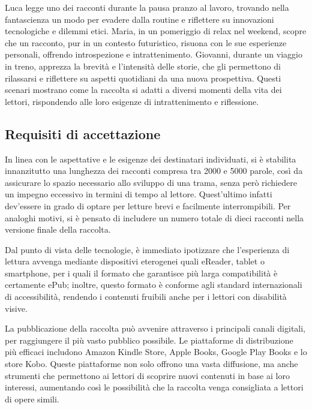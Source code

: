 \documentclass[a4paper,12pt]{article}
\begin{document}
Luca legge uno dei racconti durante la pausa pranzo al lavoro, trovando nella fantascienza un modo per evadere dalla routine e riflettere su innovazioni tecnologiche e dilemmi etici. Maria, in un pomeriggio di relax nel weekend, scopre che un racconto, pur in un contesto futuristico, risuona con le sue esperienze personali, offrendo introspezione e intrattenimento. Giovanni, durante un viaggio in treno, apprezza la brevità e l'intensità delle storie, che gli permettono di rilassarsi e riflettere su aspetti quotidiani da una nuova prospettiva. Questi scenari mostrano come la raccolta si adatti a diversi momenti della vita dei lettori, rispondendo alle loro esigenze di intrattenimento e riflessione.

\subsection*{Requisiti di accettazione}

In linea con le aspettative e le esigenze dei destinatari individuati, si è stabilita innanzitutto una lunghezza dei racconti compresa tra 2000 e 5000 parole, così da assicurare lo spazio necessario allo sviluppo di una trama, senza però richiedere un impegno eccessivo in termini di tempo al lettore. Quest'ultimo infatti dev'essere in grado di optare per letture brevi e facilmente interrompibili. Per analoghi motivi, si è pensato di includere un numero totale di dieci racconti nella versione finale della raccolta. 

\bigbreak 

Dal punto di vista delle tecnologie, è immediato ipotizzare che l'esperienza di lettura avvenga mediante dispositivi eterogenei quali eReader, tablet o smartphone, per i quali il formato che garantisce più larga compatibilità è certamente ePub; inoltre, questo formato è conforme agli standard internazionali di accessibilità, rendendo i contenuti fruibili anche per i lettori con disabilità visive.

\bigbreak

La pubblicazione della raccolta può avvenire attraverso i principali canali digitali, per raggiungere il più vasto pubblico possibile. Le piattaforme di distribuzione più efficaci includono Amazon Kindle Store, Apple Books, Google Play Books e lo store Kobo. Queste piattaforme non solo offrono una vasta diffusione, ma anche strumenti che permettono ai lettori di scoprire nuovi contenuti in base ai loro interessi, aumentando così le possibilità che la raccolta venga consigliata a lettori di opere simili.
\end{document}
